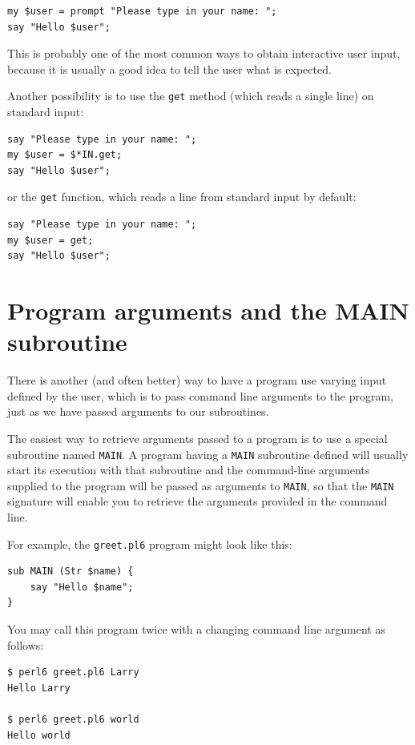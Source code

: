 \begin{verbatim}
my $user = prompt "Please type in your name: ";
say "Hello $user";
\end{verbatim}
%

This is probably one of the most common ways to obtain 
interactive user input, because it is usually a good idea 
to tell the user what is expected.

Another possibility is to use the {\tt get} method (which reads a single line) on standard input:

\begin{verbatim}
say "Please type in your name: ";
my $user = $*IN.get;
say "Hello $user";
\end{verbatim}
%
or the {\tt get} function, which reads a line from standard input by default:
\begin{verbatim}
say "Please type in your name: ";
my $user = get;
say "Hello $user";
\end{verbatim}
%

\section{Program arguments and the MAIN subroutine}
\label{MAIN}

There is another (and often better) way to have a program 
use varying input defined by the user, which is to pass 
command line arguments to the program, just as we have 
passed arguments to our subroutines.

The easiest way to retrieve arguments passed to a program is 
to use a special subroutine named \verb'MAIN'. A program 
having a \verb'MAIN' subroutine defined will usually start its execution 
with that subroutine and the command-line arguments supplied 
to the program will be passed as arguments to \verb'MAIN', 
so that the \verb'MAIN' signature will enable you to 
retrieve the arguments provided in the command line.

For example, the {\tt greet.pl6} program might look like 
this:
\begin{verbatim}
sub MAIN (Str $name) {
    say "Hello $name";
}
\end{verbatim}

You may call this program twice with a changing command line 
argument as follows:

\begin{verbatim}
$ perl6 greet.pl6 Larry
Hello Larry

$ perl6 greet.pl6 world
Hello world
\end{verbatim}


